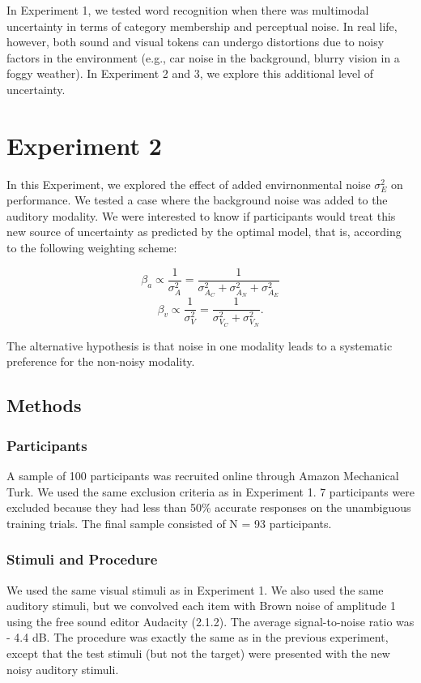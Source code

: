 \documentclass[english,,man,floatsintext]{apa6}
\theoremstyle{definition}
\theoremstyle{definition}
\theoremstyle{definition}
\theoremstyle{remark}
\begin{document}
In Experiment 1, we tested word recognition when there was multimodal
uncertainty in terms of category membership and perceptual noise. In
real life, however, both sound and visual tokens can undergo distortions
due to noisy factors in the environment (e.g., car noise in the
background, blurry vision in a foggy weather). In Experiment 2 and 3, we
explore this additional level of uncertainty.

\section{Experiment 2}\label{experiment-2}

In this Experiment, we explored the effect of added envirnonmental noise
\(\sigma^2_{E}\) on performance. We tested a case where the background
noise was added to the auditory modality. We were interested to know if
participants would treat this new source of uncertainty as predicted by
the optimal model, that is, according to the following weighting scheme:

\[\beta_a \propto \frac{1}{\sigma^2_{A}} = \frac{1}{\sigma^2_{A_C}+\sigma^2_{A_N} + \sigma^2_{A_E}}\]
\[\beta_v \propto \frac{1}{\sigma^2_{V}} = \frac{1}{\sigma^2_{V_C}+\sigma^2_{V_N}}.\]

The alternative hypothesis is that noise in one modality leads to a
systematic preference for the non-noisy modality.

\subsection{Methods}\label{methods-1}

\subsubsection{Participants}\label{participants-1}

A sample of 100 participants was recruited online through Amazon
Mechanical Turk. We used the same exclusion criteria as in Experiment 1.
7 participants were excluded because they had less than 50\% accurate
responses on the unambiguous training trials. The final sample consisted
of N = 93 participants.

\subsubsection{Stimuli and Procedure}\label{stimuli-and-procedure}

We used the same visual stimuli as in Experiment 1. We also used the
same auditory stimuli, but we convolved each item with Brown noise of
amplitude 1 using the free sound editor Audacity (2.1.2). The average
signal-to-noise ratio was - 4.4 dB. The procedure was exactly the same
as in the previous experiment, except that the test stimuli (but not the
target) were presented with the new noisy auditory stimuli.
\end{document}
